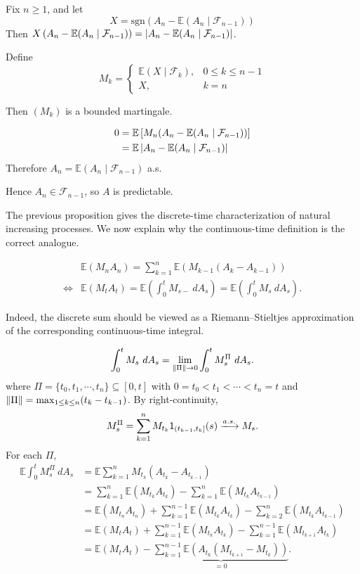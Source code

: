 {    Fix $n \geq 1$, and let
    $$
        X = \mathrm{sgn} \left( A_n - \mathbb{E}(A_n \mid \mathcal{F}_{n-1}) \right)
    $$
    Then $X\left( A_n - \mathbb{E}(A_n\mid \mathcal{F}_{n-1}) \right) = \left| A_n - \mathbb{E}(A_n \mid \mathcal{F}_{n-1}) \right|$.

    Define
    $$
    M_k = \begin{cases}
       \mathbb{E}(X \mid \mathcal{F}_{k}),& 0 \leq k \leq n-1\\
       X, &k=n
    \end{cases}
    $$

    Then $(M_k)$ is a bounded martingale.

    $$
    \begin{aligned}
        0 &= \mathbb{E}\left[ M_n (A_n - \mathbb{E}(A_n \mid \mathcal{F}_{n-1})) \right]\\
        &= \mathbb{E} \left| A_n - \mathbb{E}(A_n \mid \mathcal{F}_{n-1}) \right|
    \end{aligned}
    $$
    Therefore $A_n = \mathbb{E}(A_n \mid \mathcal{F}_{n-1})$ a.s.
    
    Hence $A_n \in \mathcal{F}_{n-1}$, so $A$ is predictable.
}

The previous proposition gives the discrete-time characterization of natural increasing processes.
We now explain why the continuous-time definition is the correct analogue.

$$
    \begin{aligned}
        &\mathbb{E}(M_n A_n) = \sum_{k=1}^n \mathbb{E}\left( M_{k-1} (A_k - A_{k-1}) \right) \\
        \Longleftrightarrow &
        \mathbb{E}(M_tA_t) = \mathbb{E}\left( \int_{0}^{t}M_{s-}~dA_s \right) = \mathbb{E}\left( \int_{0}^{t} M_s ~dA_s \right).
    \end{aligned}
$$

Indeed, the discrete sum should be viewed as a Riemann--Stieltjes approximation of the corresponding continuous-time integral.

$$
    \int_{0}^{t} M_s ~d A_s = \lim_{\left\| \Pi \right\|\to 0} \int_{0}^{t} M_s^\Pi ~d A_s.
$$
where $\Pi = \{t_0, t_1,\cdots,t_n\}\subseteq[0,t]$ with $0 = t_0 < t_1 < \cdots < t_n = t$ and $\left\| \Pi \right\| = \max_{1 \leq k \leq n}(t_k - t_{k-1})$. By right-continuity,
$$
    M_s^\Pi = \sum_{k=1}^{n} M_{t_k}\mathsf{1}_{(t_{k-1},t_k]}(s) \xlongrightarrow{a.s.} M_s.
$$
For each $\Pi$,
$$
\begin{aligned}
\mathbb{E}\int_{0}^{t}M_s ^\Pi ~d A_s
&= \mathbb{E} \sum_{k=1}^n M_{t_k}(A_{t_k} - A_{t_{k-1}}) \\
&= \sum_{k=1}^n \mathbb{E}(M_{t_k}A_{t_k}) - \sum_{k=1}^n \mathbb{E}(M_{t_k}A_{t_{k-1}})\\
&= \mathbb{E}(M_{t_n}A_{t_n}) + \sum_{k=1}^{n-1}\mathbb{E}(M_{t_{k}} A_{t_{k}}) - \sum_{k=2}^{n}\mathbb{E}(M_{t_k} A_{t_{k-1}})\\
&= \mathbb{E}(M_t A_t) + \sum_{k=1}^{n-1}\mathbb{E}(M_{t_k} A_{t_k}) - \sum_{k=1}^{n-1}\mathbb{E}(M_{t_{k+1}}A_{t_k}) \\
&= \mathbb{E}(M_t A_t) - \underbrace{\sum_{k=1}^{n-1}\mathbb{E}\left( A_{t_k} (M_{t_{k+1}} - M_{t_k}) \right)}_{=0}.
\end{aligned}
$$

